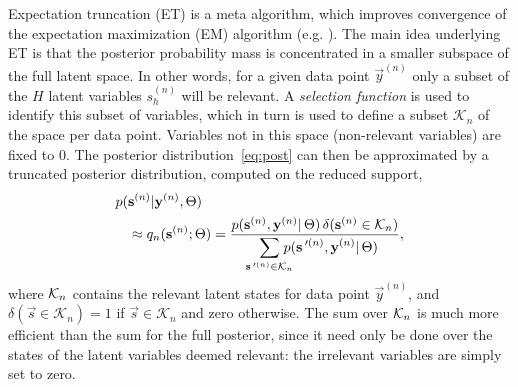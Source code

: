 %
%

%
Expectation truncation (ET) is a meta algorithm, which improves convergence of the expectation maximization (EM) algorithm (e.g. \citep{DempsterEtAl1977,
NealHinton1998}).
%
The main idea underlying ET is that the posterior probability mass is concentrated in a smaller subspace of the full latent space.
In other words, for a given data point $\vec{y}^{(n)}$ 
only a subset of the $H$ latent variables $s_h^{(n)}$ will be relevant.
A \textit{selection function} is used to identify this subset
of variables, which in turn is used to define a subset $\mathcal{K}_n$ of the space per data point. 
Variables not in this space (non-relevant variables) are fixed to 0.
%
The posterior distribution~\eqref{eq:post} can then be approximated by a truncated posterior distribution, computed on the reduced support,
%
\vspace{-.1cm}
\begin{align}
\label{eq:sel-post}
p(&\vec{s}^{(n)}|\vec{y}^{(n)},\Theta) \nonumber\\
&\approx q_n(\vec{s}^{(n)};\Theta) = \frac{p(\vec{s}^{(n)},\vec{y}^{(n)}|\,\Theta) \,\delta(\vec{s}^{(n)}\in\hspace{-.05mm}\Kn)}
{\disS\hspace{-1.5mm}\sum_{\vec{s}\Prime^{(n)}\in\mathcal{K}_n}\hspace{-3mm} p(\vec{s}\Prime^{(n)},\vec{y}^{(n)}|\,\Theta)},
\end{align}
\normalsize
%
where $\mathcal{K}_{n}$ contains the relevant latent states for data point
$\vec{y}^{(n)}$, and $\delta(\vec{s}\in\mathcal{K}_n)=1$ if
$\vec{s}\in\mathcal{K}_n$ and zero otherwise.
The sum over $\mathcal{K}_{n}$ is much more  efficient than the sum for the full posterior, since it need only be done over the states of the latent variables deemed relevant: the irrelevant variables are simply set to zero.

